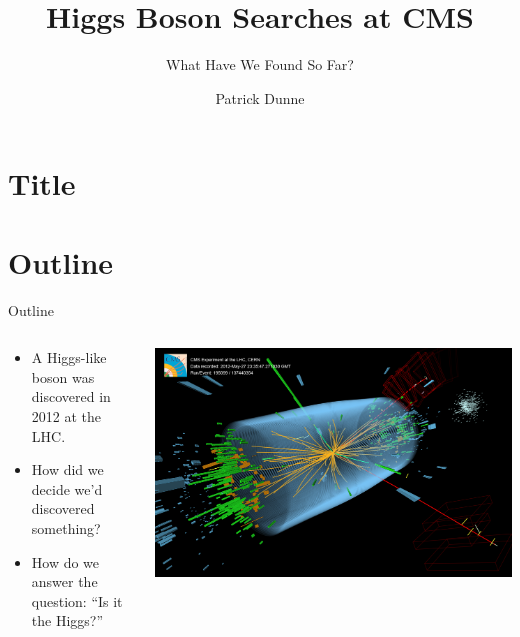 \documentclass{beamer}
\title{Higgs Boson Searches at CMS}
\subtitle{What Have We Found So Far?}
\author{Patrick Dunne}
\date{}
\begin{document}
\section{Title}
\begin{frame}
  \titlepage
\end{frame}


\section{Outline}
\begin{frame}{Outline}
  \begin{columns}
    \begin{column}{.5\textwidth}
      \begin{itemize}
      \item A Higgs-like boson was discovered in 2012 at the LHC.
      \item How did we decide we'd discovered something?
      \item How do we answer the question: ``Is it the Higgs?''
      \end{itemize}
    \end{column}
    \begin{column}{.5\textwidth}
      \includegraphics[width=\textwidth]{TalkPics/cmshtozzevent.png}
    \end{column}
  \end{columns}
\end{frame}
\end{document}
